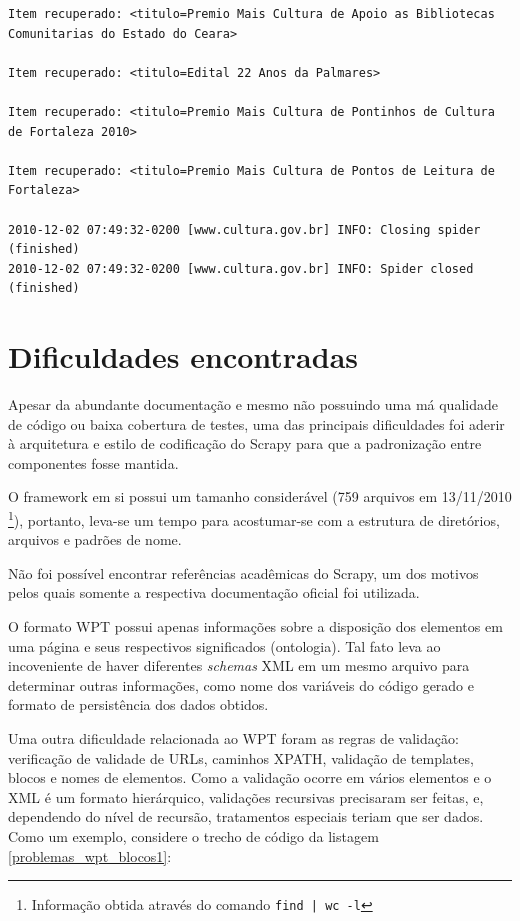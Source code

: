\begin{lstlisting}[label=scrapy_wpt_minc]
Item recuperado: <titulo=Premio Mais Cultura de Apoio as Bibliotecas Comunitarias do Estado do Ceara> 

Item recuperado: <titulo=Edital 22 Anos da Palmares> 

Item recuperado: <titulo=Premio Mais Cultura de Pontinhos de Cultura de Fortaleza 2010> 

Item recuperado: <titulo=Premio Mais Cultura de Pontos de Leitura de Fortaleza> 

2010-12-02 07:49:32-0200 [www.cultura.gov.br] INFO: Closing spider (finished)
2010-12-02 07:49:32-0200 [www.cultura.gov.br] INFO: Spider closed (finished)
\end{lstlisting}

\pagebreak
\section{Dificuldades encontradas}

Apesar da abundante documentação e mesmo não possuindo uma má qualidade de código ou baixa cobertura de testes, uma das principais dificuldades foi aderir à arquitetura e estilo de codificação do Scrapy para que a padronização entre componentes fosse mantida.

O framework em si possui um tamanho considerável (759 arquivos em 13/11/2010 \footnote{Informação obtida através do comando \texttt{find | wc -l} }), portanto, leva-se um tempo para acostumar-se com a estrutura de diretórios, arquivos e padrões de nome.

Não foi possível encontrar referências acadêmicas do Scrapy, um dos motivos pelos quais somente a respectiva documentação oficial foi utilizada.

O formato WPT possui apenas informações sobre a disposição dos elementos em uma página e seus respectivos significados (ontologia). Tal fato leva ao incoveniente de haver diferentes \emph{schemas} XML em um mesmo arquivo para determinar outras informações, como nome dos variáveis do código gerado e formato de persistência dos dados obtidos.

Uma outra dificuldade relacionada ao WPT foram as regras de validação: verificação de validade de URLs, caminhos XPATH, validação de templates, blocos e nomes de elementos. Como a validação ocorre em vários elementos e o XML é um formato hierárquico, validações recursivas precisaram ser feitas, e, dependendo do nível de recursão, tratamentos especiais teriam que ser dados. Como um exemplo, considere o trecho de código da listagem \ref{problemas_wpt_blocos1}:

